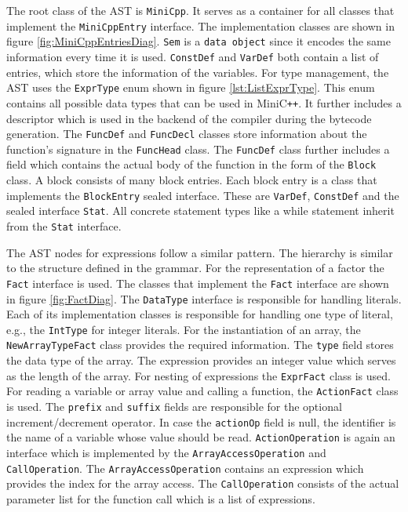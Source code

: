 The root class of the AST is \verb|MiniCpp|. It serves as a container for all classes that implement the \verb|MiniCppEntry| interface. The implementation classes are shown in figure \ref{fig:MiniCppEntriesDiag}. \verb|Sem| is a \verb|data object| since it encodes the same information every time it is used. \verb|ConstDef| and \verb|VarDef| both contain a list of entries, which store the information of the variables. For type management, the AST uses the \verb|ExprType| enum shown in figure \ref{lst:ListExprType}. This enum contains all possible data types that can be used in MiniC\verb|++|. It further includes a descriptor which is used in the backend of the compiler during the bytecode generation. The \verb|FuncDef| and \verb|FuncDecl| classes store information about the function's signature in the \verb|FuncHead| class. The  \verb|FuncDef| class further includes a field which contains the actual body of the function in the form of the \texttt{Block} class. A block consists of many block entries. Each block entry is a class that implements the \verb|BlockEntry| sealed interface. These are \verb|VarDef|, \verb|ConstDef| and the sealed interface \verb|Stat|. All concrete statement types like a while statement inherit from the \verb|Stat| interface. 

The AST nodes for expressions follow a similar pattern. The hierarchy is similar to the structure defined in the grammar. For the representation of a factor the \verb|Fact| interface is used. The classes that implement the \verb|Fact| interface are shown in figure \ref{fig:FactDiag}. The \verb|DataType| interface is responsible for handling literals. Each of its implementation classes is responsible for handling one type of literal, e.g., the \verb|IntType| for integer literals. For the instantiation of an array, the \verb|NewArrayTypeFact| class provides the required information. The \verb|type| field stores the data type of the array. The expression provides an integer value which serves as the length of the array. For nesting of expressions the \verb|ExprFact| class is used. For reading a variable or array value and calling a function, the \verb|ActionFact| class is used. The \verb|prefix| and \verb|suffix| fields are responsible for the optional increment/decrement operator. In case the \verb|actionOp| field is null, the identifier is the name of a variable whose value should be read. \verb|ActionOperation| is again an interface which is implemented by the \verb|ArrayAccessOperation| and \verb|CallOperation|. The \verb|ArrayAccessOperation| contains an expression which provides the index for the array access. The \verb|CallOperation| consists of the actual parameter list for the function call which is a list of expressions.

